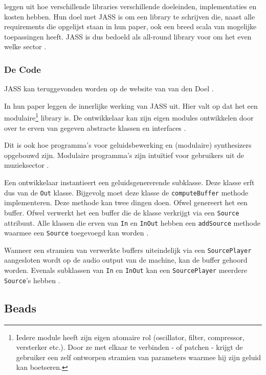 \textcite{jass} leggen uit hoe verschillende libraries verschillende doeleinden, implementaties en kosten hebben. Hun doel met JASS is om een library te schrijven die, naast alle requirements die opgelijst staan in hun paper, ook een breed scala van mogelijke toepassingen heeft. JASS is dus bedoeld als all-round library voor om het even welke sector \autocite{jass}.

\subsubsection*{De Code}
\label{sec:jass_code}

JASS kan teruggevonden worden op de website van van den Doel \autocite{jasscode}.

In hun paper leggen \textcite{jass} de innerlijke werking van JASS uit. Hier valt op dat het een modulaire\footnote{Iedere module heeft zijn eigen atomaire rol (oscillator, filter, compressor, versterker etc.). Door ze met elkaar te verbinden - of patchen - krijgt de gebruiker een zelf ontworpen stramien van parameters waarmee hij zijn geluid kan boetseren.} library is. De ontwikkelaar kan zijn eigen modules ontwikkelen door over te erven van gegeven abstracte klassen en interfaces  \autocite{jass}. 

Dit is ook hoe programma's voor geluidsbewerking en (modulaire) synthesizers opgebouwd zijn. Modulaire programma's zijn intuïtief voor gebruikers uit de muzieksector \autocite{bartvincent}.

Een ontwikkelaar instantieert een geluidsgenererende subklasse. Deze klasse erft dus van de \verb+Out+ klasse. Bijgevolg moet deze klasse de \verb+computeBuffer+ methode implementeren. Deze methode kan twee dingen doen. Ofwel genereert het een buffer. Ofwel verwerkt het een buffer die de klasse verkrijgt via een \verb+Source+ attribuut. Alle klassen die erven van \verb+In+ en \verb+InOut+ hebben een \verb+addSource+ methode waarmee een \verb+Source+ toegevoegd kan worden \autocite{jass}.

Wanneer een stramien van verwerkte buffers uiteindelijk via een \verb+SourcePlayer+ aangesloten wordt op de audio output van de machine, kan de buffer gehoord worden. Evenals subklassen van \verb+In+ en \verb+InOut+ kan een \verb+SourcePlayer+ meerdere \verb+Source+'s hebben \autocite{jass}.

\subsection{Beads}


